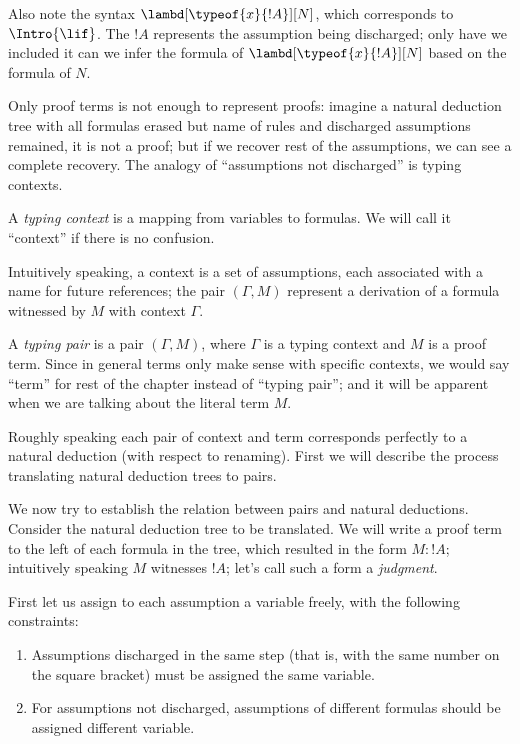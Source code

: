 \documentclass[../../../include/open-logic-section]{subfiles}
\begin{document}
Also note the syntax $\lambd[\typeof{x}{!A}][N]$, which corresponds to
$\Intro{\lif}$. The $!A$ represents the assumption being discharged;
only have we included it can we infer the formula of
$\lambd[\typeof{x}{!A}][N]$ based on the formula of $N$.

Only proof terms is not enough to represent proofs: imagine a natural
deduction tree with all formulas erased but name of rules and
discharged assumptions remained, it is not a proof; but if we recover
rest of the assumptions, we can see a complete recovery. The analogy
of ``assumptions not discharged'' is typing contexts.

\begin{defn}
  A \emph{typing context} is a mapping from variables to formulas. We
  will call it ``context'' if there is no confusion.
\end{defn}
Intuitively speaking, a context is a set of assumptions, each
associated with a name for future references; the pair $(\Gamma, M)$
represent a derivation of a formula witnessed by $M$ with context
$\Gamma$.

\begin{defn}
  A \emph{typing pair} is a pair $(\Gamma, M)$,
  where $\Gamma$ is a typing context and $M$ is a proof term. Since
  in general terms only make sense with specific contexts, we would
  say ``term'' for rest of the chapter instead of ``typing pair''; and
  it will be apparent when we are talking about the literal term $M$.
\end{defn}

Roughly speaking each pair of context and term corresponds perfectly to a natural deduction (with respect to
renaming). First we will describe the process translating natural
deduction trees to pairs.

We now try to establish the relation between pairs and natural
deductions. 
Consider the natural deduction tree to be translated. We will
write a proof term to the left of each formula in the tree, which
resulted in the form $M : !A$; intuitively speaking $M$ witnesses $!A$;
let's call such a form a \emph{judgment}.

First let us assign to each assumption a variable freely, with the following constraints:
\begin{enumerate}
\item Assumptions discharged in the same step (that is, with the same
  number on the square bracket) must be assigned the same variable.
\item For assumptions not discharged, assumptions of different
  formulas should be assigned different variable.
\end{enumerate}
\end{document}
